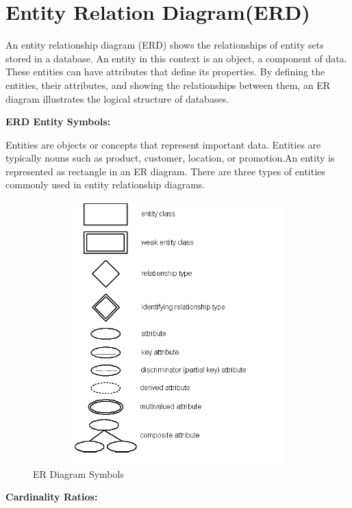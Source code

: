 \documentclass[12pt,a4paper]{report}
\begin{document}
\section{Entity Relation Diagram(ERD)}
\par
An entity relationship diagram (ERD) shows the relationships of entity sets stored in a database. An entity in this context is an object, a component of data. These entities can have attributes that define its properties. By defining the entities, their attributes, and showing the relationships between them, an ER diagram illustrates the logical structure of databases.\\
\begin{flushleft}
\textbf{ERD Entity Symbols:}\\
\end{flushleft}
\begin{flushleft}
Entities are objects or concepts that represent important data. Entities are typically nouns such as product, customer, location, or promotion.An entity is represented as rectangle in an ER diagram. There are three types of entities commonly used in entity relationship diagrams.\\
\end{flushleft}
\begin{figure}[hbtp]
\begin{center}
\includegraphics[width=6in,height=4in]{../fig/ERSYMBOLS}
\end{center}
\caption{ER Diagram Symbols }
\end{figure}
\begin{flushleft}
\textbf{Cardinality Ratios:}\\
\end{flushleft}
\end{document}
